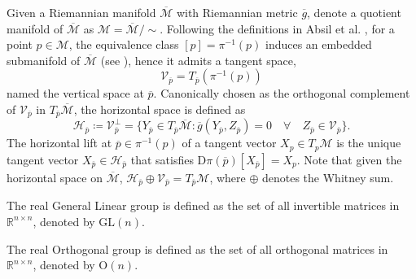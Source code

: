 \begin{definition}\label{def:horizontal_vertical_space}
    Given a Riemannian manifold $\overline{\mathcal{M}}$ with Riemannian metric $\overline{g}$, denote a quotient manifold of $\overline{\mathcal{M}}$ as $\mathcal{M}=\overline{\mathcal{M}}/\sim$. 
    Following the definitions in Absil et al. \cite[p.~43]{AbsilMahonySepulchre2008}, for a point $p\in \mathcal{M}$, the equivalence class $[p]=\pi^{-1}(p)$ induces an embedded submanifold of $\overline{\mathcal{M}}$ (see ), hence it admits a tangent space,
    \begin{equation*}
        \mathcal{V}_{\overline{p}}=T_{\overline{p}}(\pi^{-1}(p))
    \end{equation*}
    named the \textup{vertical space} at $\overline{p}$. Canonically chosen as the orthogonal complement of $\mathcal{V}_{\overline{p}}$ in $T_{\overline{p}}\overline{\mathcal{M}}$, the \textup{horizontal space} \cite[p.~48]{AbsilMahonySepulchre2008} is defined as %
    \begin{equation*}
        \mathcal{H}_{\overline{p}}\coloneqq \mathcal{V}_{\overline{p}}^\perp=\{Y_{\overline{p}}\in T_{\overline{p}}\overline{\mathcal{M}}:\overline{g}(Y_{\overline{p}},Z_{\overline{p}})=0\quad\forall\quad Z_{\overline{p}}\in \mathcal{V}_{\overline{p}} \}.
    \end{equation*}
    The \textup{horizontal lift} at $\overline{p}\in\pi^{-1}(p)$ of a tangent vector $X_{p}\in T_{p}\mathcal{M}$ is the unique tangent vector $X_{\overline{p}}\in \mathcal{H}_{\overline{p}}$ that satisfies $\mathrm{D}\pi(\overline{p})[{X}_{\overline{p}}]=X_p$. Note that given the horizontal space on $\overline{\mathcal{M}}$, $\mathcal{H}_{\overline{p}}\oplus \mathcal{V}_{\overline{p}}=T_{\overline{p}}\mathcal{M}$, where $\oplus$ denotes the Whitney sum. 
\end{definition}

\begin{definition}\label{def:general_linear_group}
    The \textup{real General Linear group} is defined as the set of all invertible matrices in $\mathbb{R}^{n\times n}$, denoted by $\mathrm{GL}(n)$. \cite[Example~9.11]{Boumal2023}
\end{definition}

\begin{definition}\label{def:orthogonal_group}
    The \textup{real Orthogonal group} is defined as the set of all orthogonal matrices in $\mathbb{R}^{n\times n}$, denoted by $\mathrm{O}(n)$. \cite[p.~3]{Edelman1998}
\end{definition}

